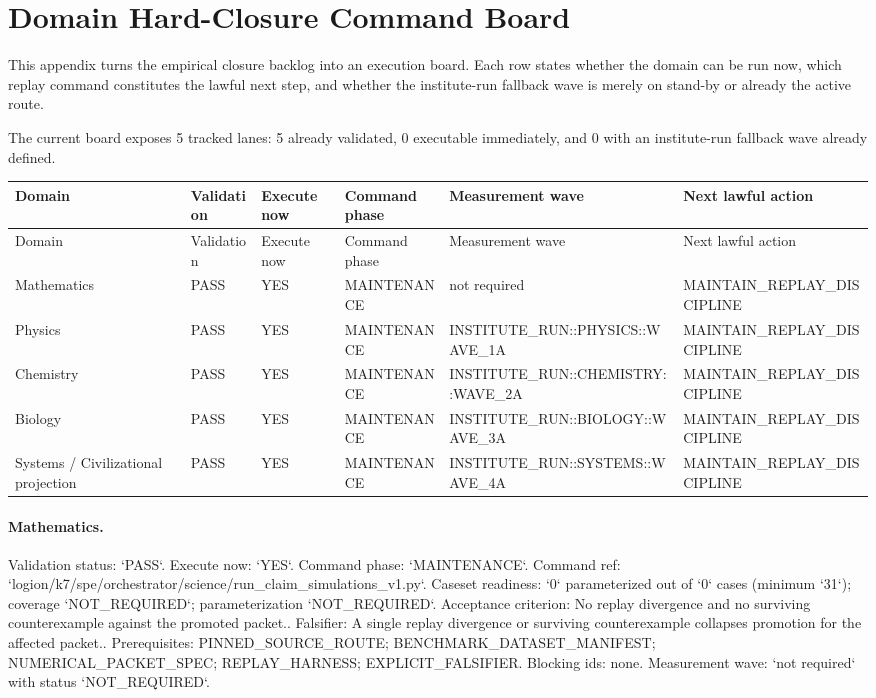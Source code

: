 \section{Domain Hard-Closure Command Board}

This appendix turns the empirical closure backlog into an execution board. Each row states whether the domain can be run now, which replay command constitutes the lawful next step, and whether the institute-run fallback wave is merely on stand-by or already the active route.

The current board exposes 5 tracked lanes: 5 already validated, 0 executable immediately, and 0 with an institute-run fallback wave already defined.

\begin{longtable}{p{}p{}p{}p{}p{}p{}}
\toprule
Domain & Validation & Execute now & Command phase & Measurement wave & Next lawful action \\
\midrule
\endfirsthead
\toprule
Domain & Validation & Execute now & Command phase & Measurement wave & Next lawful action \\
\midrule
\endhead
Mathematics & PASS & YES & MAINTENANCE & not required & MAINTAIN\_REPLAY\_DISCIPLINE \\
Physics & PASS & YES & MAINTENANCE & INSTITUTE\_RUN::PHYSICS::WAVE\_1A & MAINTAIN\_REPLAY\_DISCIPLINE \\
Chemistry & PASS & YES & MAINTENANCE & INSTITUTE\_RUN::CHEMISTRY::WAVE\_2A & MAINTAIN\_REPLAY\_DISCIPLINE \\
Biology & PASS & YES & MAINTENANCE & INSTITUTE\_RUN::BIOLOGY::WAVE\_3A & MAINTAIN\_REPLAY\_DISCIPLINE \\
Systems / Civilizational projection & PASS & YES & MAINTENANCE & INSTITUTE\_RUN::SYSTEMS::WAVE\_4A & MAINTAIN\_REPLAY\_DISCIPLINE \\
\bottomrule
\end{longtable}

\paragraph{Mathematics.}
Validation status: `PASS`. Execute now: `YES`. Command phase: `MAINTENANCE`.
Command ref: `logion/k7/spe/orchestrator/science/run\_claim\_simulations\_v1.py`.
Caseset readiness: `0` parameterized out of `0` cases (minimum `31`); coverage `NOT\_REQUIRED`; parameterization `NOT\_REQUIRED`.
Acceptance criterion: No replay divergence and no surviving counterexample against the promoted packet..
Falsifier: A single replay divergence or surviving counterexample collapses promotion for the affected packet..
Prerequisites: PINNED\_SOURCE\_ROUTE; BENCHMARK\_DATASET\_MANIFEST; NUMERICAL\_PACKET\_SPEC; REPLAY\_HARNESS; EXPLICIT\_FALSIFIER.
Blocking ids: none.
Measurement wave: `not required` with status `NOT\_REQUIRED`.

